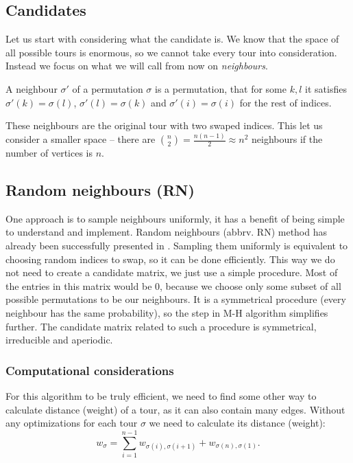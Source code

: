 \subsection{Candidates}
	Let us start with considering what the candidate is. We know that the space of all possible tours is enormous, so we cannot take every tour into consideration. Instead we focus on what we will call from now on \textit{neighbours}.
	\begin{definition}
		A neighbour $\sigma'$ of a permutation $\sigma$ is a permutation, that for some $k, l$ it satisfies $\sigma'(k) = \sigma(l)$, $\sigma'(l) = \sigma(k)$ and $\sigma'(i) = \sigma(i)$ for the rest of indices.
	\end{definition}
	These neighbours are the original tour with two swaped indices. This let  us consider a smaller space -- there are $\binom{n}{2} = \frac{n(n-1)}{2} \approx n^2$ neighbours if the number of vertices is $n$.

\subsection{Random neighbours (RN)}
	One approach is to sample neighbours uniformly, it has a benefit of being simple to understand and implement. Random neighbours (abbrv. RN) method has already been successfully presented in \cite{decryption_tsp_MCMC}. Sampling them uniformly is equivalent to choosing random indices to swap, so it can be done efficiently. This way we do not need to create a candidate matrix, we just use a simple procedure. Most of the entries in this matrix would be $0$, because we choose only some subset of all possible permutations to be our neighbours. It is a symmetrical procedure (every neighbour has the same probability), so the step in M-H algorithm simplifies further. The candidate matrix related to such a procedure is symmetrical, irreducible and aperiodic.
	
	\subsubsection{Computational considerations}
		For this algorithm to be truly efficient, we need to find some other way to calculate distance (weight) of a tour, as it can also contain many edges. Without any optimizations for each tour $\sigma$ we need to calculate its distance (weight):
		\begin{equation*}
			w_\sigma = \sum_{i=1}^{n-1} w_{\sigma(i), \sigma(i+1)} + w_{\sigma(n), \sigma(1)}.
		\end{equation*}
		
